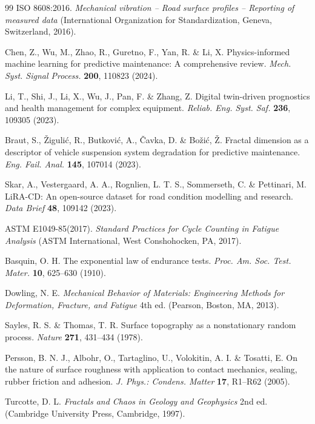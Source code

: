 \documentclass[11pt]{article}
\begin{document}
\begin{thebibliography}{99}
ISO 8608:2016. \textit{Mechanical vibration -- Road surface profiles -- Reporting of measured data} (International Organization for Standardization, Geneva, Switzerland, 2016).

Chen, Z., Wu, M., Zhao, R., Guretno, F., Yan, R. \& Li, X. Physics-informed machine learning for predictive maintenance: A comprehensive review. \textit{Mech. Syst. Signal Process.} \textbf{200}, 110823 (2024).

Li, T., Shi, J., Li, X., Wu, J., Pan, F. \& Zhang, Z. Digital twin-driven prognostics and health management for complex equipment. \textit{Reliab. Eng. Syst. Saf.} \textbf{236}, 109305 (2023).

Braut, S., Žigulić, R., Butković, A., Čavka, D. \& Božić, Ž. Fractal dimension as a descriptor of vehicle suspension system degradation for predictive maintenance. \textit{Eng. Fail. Anal.} \textbf{145}, 107014 (2023).

Skar, A., Vestergaard, A. A., Rognlien, L. T. S., Sommerseth, C. \& Pettinari, M. LiRA-CD: An open-source dataset for road condition modelling and research. \textit{Data Brief} \textbf{48}, 109142 (2023).

ASTM E1049-85(2017). \textit{Standard Practices for Cycle Counting in Fatigue Analysis} (ASTM International, West Conshohocken, PA, 2017).

Basquin, O. H. The exponential law of endurance tests. \textit{Proc. Am. Soc. Test. Mater.} \textbf{10}, 625--630 (1910).

Dowling, N. E. \textit{Mechanical Behavior of Materials: Engineering Methods for Deformation, Fracture, and Fatigue} 4th ed. (Pearson, Boston, MA, 2013).

Sayles, R. S. \& Thomas, T. R. Surface topography as a nonstationary random process. \textit{Nature} \textbf{271}, 431--434 (1978).

Persson, B. N. J., Albohr, O., Tartaglino, U., Volokitin, A. I. \& Tosatti, E. On the nature of surface roughness with application to contact mechanics, sealing, rubber friction and adhesion. \textit{J. Phys.: Condens. Matter} \textbf{17}, R1--R62 (2005).

Turcotte, D. L. \textit{Fractals and Chaos in Geology and Geophysics} 2nd ed. (Cambridge University Press, Cambridge, 1997).


\end{thebibliography}
\end{document}

